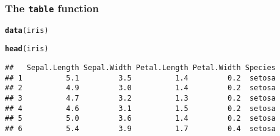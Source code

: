 \documentclass[paper=screen,mathserif]{beamer}\usepackage[]{graphicx}\usepackage[]{color}
\makeatletter
\newcommand{\hlstd}[1]{\textcolor[rgb]{0.345,0.345,0.345}{#1}}%
\newcommand{\hlkwd}[1]{\textcolor[rgb]{0.737,0.353,0.396}{\textbf{#1}}}%
\newenvironment{kframe}{%
 \def\at@end@of@kframe{}%
 \ifinner\ifhmode%
  \def\at@end@of@kframe{\end{minipage}}%
  \begin{minipage}{\columnwidth}%
 \fi\fi%
 \def\FrameCommand##1{\hskip\@totalleftmargin \hskip-\fboxsep
 \colorbox{shadecolor}{##1}\hskip-\fboxsep
     \hskip-\linewidth \hskip-\@totalleftmargin \hskip\columnwidth}%
 \MakeFramed {\advance\hsize-\width
   \@totalleftmargin\z@ \linewidth\hsize
   \@setminipage}}%
 {\par\unskip\endMakeFramed%
 \at@end@of@kframe}
\newenvironment{knitrout}{}{} %
\newcommand{\ft}[1]{\frametitle{#1}}
\makeatother
\begin{document}
\begin{frame}[fragile]
  \ft{The {\tt table} function}
  
\begin{knitrout}\scriptsize
{}\color{fgcolor}\begin{kframe}
\begin{alltt}
\hlkwd{data}\hlstd{(iris)}

\hlkwd{head}\hlstd{(iris)}
\end{alltt}
\begin{verbatim}
##   Sepal.Length Sepal.Width Petal.Length Petal.Width Species
## 1          5.1         3.5          1.4         0.2  setosa
## 2          4.9         3.0          1.4         0.2  setosa
## 3          4.7         3.2          1.3         0.2  setosa
## 4          4.6         3.1          1.5         0.2  setosa
## 5          5.0         3.6          1.4         0.2  setosa
## 6          5.4         3.9          1.7         0.4  setosa
\end{verbatim}
\end{kframe}
\end{knitrout}
\end{frame}
\end{document}
